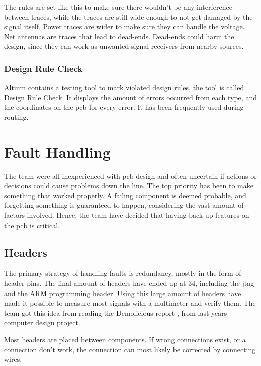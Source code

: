 The rules are set like this to make sure there wouldn't be any interference between traces, while the traces are still wide enough to not get damaged by the signal itself.
Power traces are wider to make sure they can handle the voltage.
Net antennas are traces that lead to dead-ends.
Dead-ends could harm the design, since they can work as unwanted signal receivers from nearby sources.

\subsubsection{Design Rule Check}
Altium contains a testing tool to mark violated design rules, the tool is called Design Rule Check.
It displays the amount of errors occurred from each type, and the coordinates on the \gls{pcb} for every error.
It has been frequently used during routing.

\section{Fault Handling}
The team were all inexperienced with \gls{pcb} design and often uncertain if actions or decisions could cause problems down the line.
The top priority has been to make something that worked properly.
A failing component is deemed probable, and forgetting something is guaranteed to happen, considering the vast amount of factors involved.
Hence, the team have decided that having back-up features on the \gls{pcb} is critical.

\subsection{Headers}
The primary strategy of handling faults is redundancy, mostly in the form of header pins.
The final amount of headers have ended up at 34, including the \gls{jtag} and the ARM programming header.
Using this large amount of headers have made it possible to measure most signals with a multimeter and verify them.
The team got this idea from reading the Demolicious report \cite{demolicious-report}, from last years computer design project.

Most headers are placed between components.
If wrong connections exist, or a connection don't work, the connection can most likely be corrected by connecting wires.

